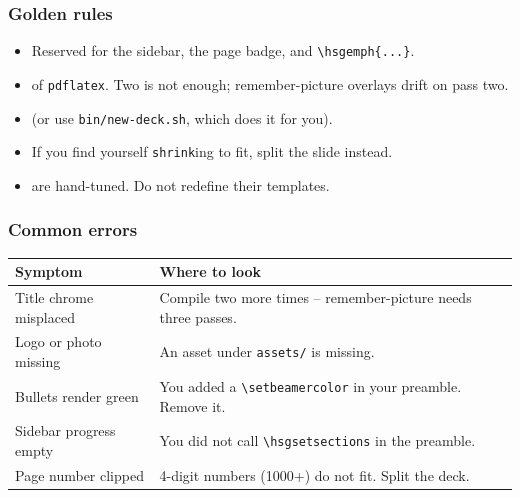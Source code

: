 \documentclass[aspectratio=169,xcolor=table]{beamer}
\begin{document}
\begin{frame}[t]
  \frametitle{Golden rules}

  \begin{itemize}
    \setlength\itemsep{0.45em}
    \item {}
          Reserved for the sidebar, the page badge, and
          \texttt{\textbackslash hsgemph\{...\}}.
    \item {} of \texttt{pdflatex}. Two is not
          enough; remember-picture overlays drift on pass two.
    \item {} (or use \texttt{bin/new-deck.sh},
          which does it for you).
    \item {} If you find yourself
          \texttt{shrink}ing to fit, split the slide instead.
    \item {} are hand-tuned. Do not redefine
          their templates.
  \end{itemize}
\end{frame}

\begin{frame}[t]
  \frametitle{Common errors}

  \begin{tabular}{@{}p{4.4cm}p{8.6cm}@{}}
    \toprule
    \textbf{Symptom} & \textbf{Where to look} \\
    \midrule
    Title chrome misplaced &
      Compile two more times -- remember-picture needs three passes. \\[3pt]
    Logo or photo missing &
      An asset under \texttt{assets/} is missing. \\[3pt]
    Bullets render green &
      You added a \texttt{\textbackslash setbeamercolor} in your
      preamble. Remove it. \\[3pt]
    Sidebar progress empty &
      You did not call \texttt{\textbackslash hsgsetsections} in the
      preamble. \\[3pt]
    Page number clipped &
      4-digit numbers (1000+) do not fit. Split the deck. \\
    \bottomrule
  \end{tabular}
\end{frame}
\end{document}
